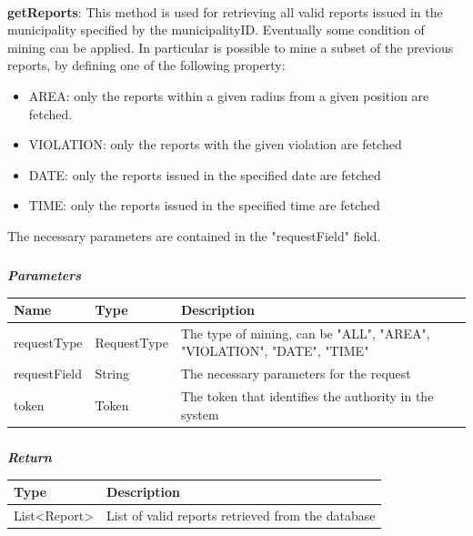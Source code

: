 				\paragraph{}
							\textbf{getReports}: This method is used for retrieving all valid reports issued in the municipality specified by the municipalityID. Eventually some condition of mining can be applied. In particular is possible to mine a subset of the previous reports, by defining one of the following property:
							\begin{itemize}
								\item AREA: only the reports within a given radius from a given position are fetched.
								\item VIOLATION: only the reports with the given violation are fetched
								\item DATE: only the reports issued in the specified date are fetched
								\item TIME: only the reports issued in the specified time are fetched
							\end{itemize}
							The necessary parameters are contained in the "requestField" field. 
							\subparagraph{}
							\vspace{-3mm}
							\textit{\textbf{Parameters}}
							\vspace{-2mm}
								\begin{table}[!h]
									\begin{tabular}{L{0.2\textwidth}L{0.2\textwidth}L{0.4\textwidth}}
										\toprule
										\textbf{Name} & \textbf{Type} & \textbf{Description} \\
										\midrule
								  		requestType & RequestType & The type of mining, can be "ALL", "AREA", "VIOLATION", "DATE", "TIME" \\
								  		requestField & String & The necessary parameters for the request \\
								  		token & Token & The token that identifies the authority in the system \\
								 		\bottomrule
									\end{tabular}
								\end{table}
							\subparagraph{}
							\vspace{-6mm}
								\textit{\textbf{Return}}
								\vspace{-2mm}
									\begin{table}[!h]
									\begin{tabular}{L{0.2\textwidth}L{0.6\textwidth}}
										\toprule
										\textbf{Type} & \textbf{Description} \\
										\midrule
								  		List<Report> & List of valid reports retrieved from the database \\
								 		\bottomrule
									\end{tabular}
								\end{table}
